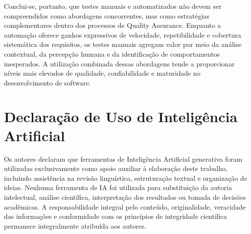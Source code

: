 \documentclass{UNESC}
\begin{document}
Conclui-se, portanto, que testes manuais e automatizados não devem ser compreendidos como abordagens concorrentes, mas como estratégias complementares dentro dos processos de Quality Assurance. Enquanto a automação oferece ganhos expressivos de velocidade, repetibilidade e cobertura sistemática dos requisitos, os testes manuais agregam valor por meio da análise contextual, da percepção humana e da identificação de comportamentos inesperados. A utilização combinada dessas abordagens tende a proporcionar níveis mais elevados de qualidade, confiabilidade e maturidade no desenvolvimento de software.

\section*{Declaração de Uso de Inteligência Artificial}
Os autores declaram que ferramentas de Inteligência Artificial generativa foram utilizadas exclusivamente como apoio auxiliar à elaboração deste trabalho, incluindo assistência na revisão linguística, estruturação textual e organização de ideias. Nenhuma ferramenta de IA foi utilizada para substituição da autoria intelectual, análise científica, interpretação dos resultados ou tomada de decisões acadêmicas. A responsabilidade integral pelo conteúdo, originalidade, veracidade das informações e conformidade com os princípios de integridade científica permanece integralmente atribuída aos autores.


\renewcommand{\refname}{REFERÊNCIAS}
 
\end{document}
